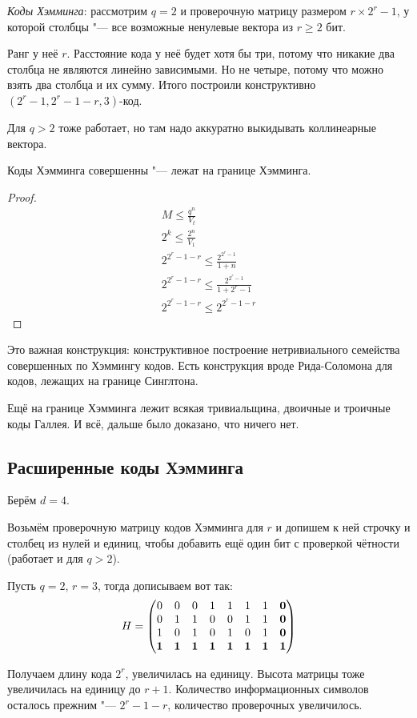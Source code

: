 \begin{Def}
	\textit{Коды Хэмминга}:
	рассмотрим $q=2$ и проверочную матрицу размером $r \times 2^r-1$,
	у которой столбцы "--- все возможные ненулевые вектора из $r \ge 2$ бит.
\end{Def}
\begin{Rem}
	Ранг у неё $r$.
	Расстояние кода у неё будет хотя бы три, потому что никакие
	два столбца не являются линейно зависимыми.
	Но не четыре, потому что можно взять два столбца и их сумму.
	Итого построили конструктивно $(2^r-1, 2^r-1-r, 3)$-код.
\end{Rem}
\begin{Rem}
	Для $q>2$ тоже работает, но там надо аккуратно выкидывать коллинеарные вектора.
\end{Rem}
\begin{lemma}
	Коды Хэмминга совершенны "--- лежат на границе Хэмминга.
\end{lemma}
\begin{proof}
	\begin{gather*}
		M \le \frac{q^n}{V_t} \\
		2^k \le \frac{2^n}{V_1} \\
		2^{2^r-1-r} \le \frac{2^{2^r-1}}{1+n} \\
		2^{2^r-1-r} \le \frac{2^{2^r-1}}{1+2^r-1} \\
		2^{2^r-1-r} \le 2^{2^r-1-r}
	\end{gather*}
\end{proof}
\begin{Rem}
	Это важная конструкция: конструктивное построение нетривиального семейства совершенных по Хэммингу кодов.
	Есть конструкция вроде Рида-Соломона для кодов, лежащих на границе Синглтона.
\end{Rem}
\begin{Rem}
	Ещё на границе Хэмминга лежит всякая тривиальщина, двоичные и троичные коды Галлея.
	И всё, дальше было доказано, что ничего нет.
\end{Rem}

\subsection{Расширенные коды Хэмминга}
Берём $d=4$.

Возьмём проверочную матрицу кодов Хэмминга для $r$ и допишем к ней строчку и столбец
из нулей и единиц, чтобы добавить ещё один бит с проверкой чётности (работает и для $q>2$).
\begin{exmp}
	Пусть $q=2$, $r=3$, тогда дописываем вот так:
	\[
	H=\begin{pmatrix}
	0 & 0 & 0 & 1 & 1 & 1 & 1 & \textbf0 \\
	0 & 1 & 1 & 0 & 0 & 1 & 1 & \textbf0 \\
	1 & 0 & 1 & 0 & 1 & 0 & 1 & \textbf0 \\
	\textbf1 & \textbf1 & \textbf1 & \textbf1 & \textbf1 & \textbf1 & \textbf1 & \textbf1
	\end{pmatrix}
	\]
\end{exmp}
Получаем длину кода $2^r$, увеличилась на единицу.
Высота матрицы тоже увеличилась на единицу до $r+1$.
Количество информационных символов осталось прежним "--- $2^r-1-r$, количество проверочных увеличилось.

